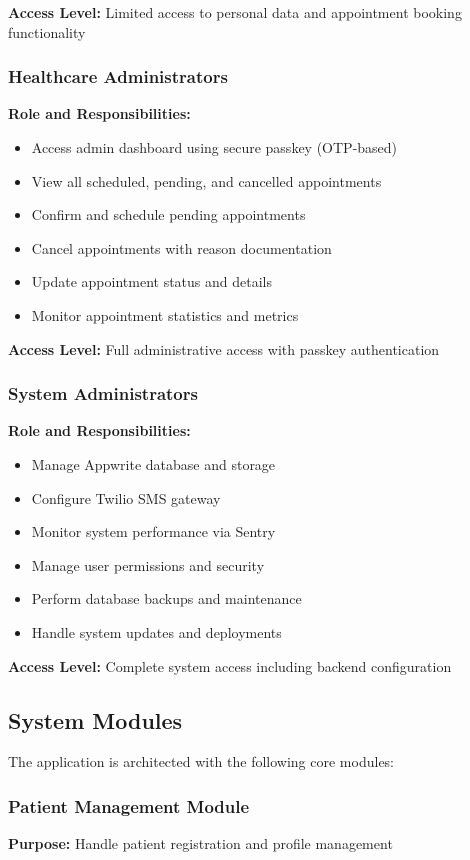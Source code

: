 \documentclass[11pt,a4paper]{article}
\begin{document}
\textbf{Access Level:} Limited access to personal data and appointment booking functionality

\subsubsection{Healthcare Administrators}
\textbf{Role and Responsibilities:}
\begin{itemize}
    \item Access admin dashboard using secure passkey (OTP-based)
    \item View all scheduled, pending, and cancelled appointments
    \item Confirm and schedule pending appointments
    \item Cancel appointments with reason documentation
    \item Update appointment status and details
    \item Monitor appointment statistics and metrics
\end{itemize}

\textbf{Access Level:} Full administrative access with passkey authentication

\subsubsection{System Administrators}
\textbf{Role and Responsibilities:}
\begin{itemize}
    \item Manage Appwrite database and storage
    \item Configure Twilio SMS gateway
    \item Monitor system performance via Sentry
    \item Manage user permissions and security
    \item Perform database backups and maintenance
    \item Handle system updates and deployments
\end{itemize}

\textbf{Access Level:} Complete system access including backend configuration

\subsection{System Modules}

The application is architected with the following core modules:

\subsubsection{Patient Management Module}
\textbf{Purpose:} Handle patient registration and profile management
\end{document}
